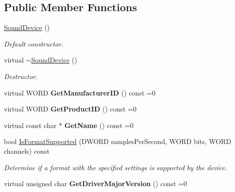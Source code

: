 \subsection*{Public Member Functions}
\begin{DoxyCompactItemize}
\item 
\hypertarget{class_sound_device_a4c32e9e396afc2f33fd084ca0c23763b}{
\hyperlink{class_sound_device_a4c32e9e396afc2f33fd084ca0c23763b}{SoundDevice} ()}
\label{class_sound_device_a4c32e9e396afc2f33fd084ca0c23763b}

\begin{DoxyCompactList}\small\item\em Default constructor. \item\end{DoxyCompactList}\item 
\hypertarget{class_sound_device_aac25582f3f92e4d5ee732001f4e05c5f}{
virtual \hyperlink{class_sound_device_aac25582f3f92e4d5ee732001f4e05c5f}{$\sim$SoundDevice} ()}
\label{class_sound_device_aac25582f3f92e4d5ee732001f4e05c5f}

\begin{DoxyCompactList}\small\item\em Destructor. \item\end{DoxyCompactList}\item 
\hypertarget{class_sound_device_a487075246eacfe985269a5615fb4353a}{
virtual WORD {\bfseries GetManufacturerID} () const =0}
\label{class_sound_device_a487075246eacfe985269a5615fb4353a}

\item 
\hypertarget{class_sound_device_ac4e1baf3e4c991e020d54246a249a17c}{
virtual WORD {\bfseries GetProductID} () const =0}
\label{class_sound_device_ac4e1baf3e4c991e020d54246a249a17c}

\item 
\hypertarget{class_sound_device_a92b81dc5ca97fe5f2ab08b02c7820061}{
virtual const char $\ast$ {\bfseries GetName} () const =0}
\label{class_sound_device_a92b81dc5ca97fe5f2ab08b02c7820061}

\item 
bool \hyperlink{class_sound_device_a1d542357cb3c320b0461415034d548f3}{IsFormatSupported} (DWORD samplesPerSecond, WORD bits, WORD channels) const 
\begin{DoxyCompactList}\small\item\em Determine if a format with the specified settings is supported by the device. \item\end{DoxyCompactList}\item 
\hypertarget{class_sound_device_afea665a8482e9424d6b3e239886d7495}{
virtual unsigned char {\bfseries GetDriverMajorVersion} () const =0}
\label{class_sound_device_afea665a8482e9424d6b3e239886d7495}


\end{DoxyCompactItemize}
